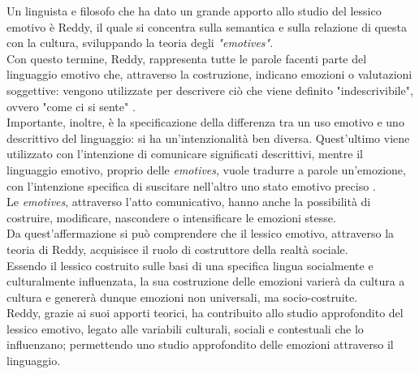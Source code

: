 Un linguista e filosofo che ha dato un grande apporto allo studio del lessico emotivo è Reddy, il quale si concentra sulla semantica e sulla relazione di questa con la cultura, sviluppando la teoria degli \textit{"emotives"}.\\
Con questo termine, Reddy, rappresenta tutte le parole facenti parte del linguaggio emotivo che, attraverso la costruzione, indicano emozioni o valutazioni soggettive: vengono utilizzate per descrivere ciò che viene definito "indescrivibile", ovvero "come ci si sente" \parencite{reddy_no_costruzionismo}.\\
Importante, inoltre, è la specificazione della differenza tra un uso emotivo e uno descrittivo del linguaggio: si ha un'intenzionalità ben diversa. Quest'ultimo viene utilizzato con l'intenzione di comunicare significati descrittivi, mentre il linguaggio emotivo, proprio delle \textit{emotives}, vuole tradurre a parole un'emozione, con l'intenzione specifica di suscitare nell'altro uno stato emotivo preciso \parencite{reddy_articolo}. \\
Le \textit{emotives}, attraverso l'atto comunicativo, hanno anche la possibilità di costruire, modificare, nascondere o intensificare le emozioni stesse.\\
Da quest'affermazione si può comprendere che il lessico emotivo, attraverso la teoria di Reddy, acquisisce il ruolo di costruttore della realtà sociale.\\
Essendo il lessico costruito sulle basi di una specifica lingua socialmente e culturalmente influenzata, la sua costruzione delle emozioni varierà da cultura a cultura e genererà dunque emozioni non universali, ma socio-costruite. \\
Reddy, grazie ai suoi apporti teorici, ha contribuito allo studio approfondito del lessico emotivo, legato alle variabili culturali, sociali e contestuali che lo influenzano; permettendo uno studio approfondito delle emozioni attraverso il linguaggio. 

